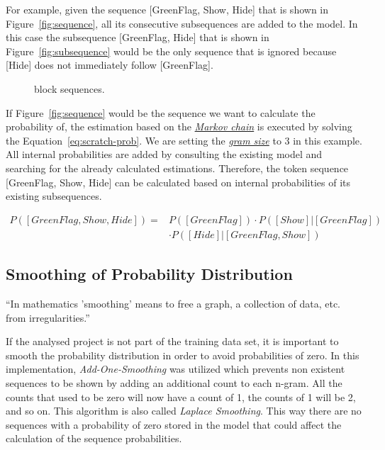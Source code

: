 For example, given the sequence [GreenFlag, Show, Hide] that is shown in Figure~\ref{fig:sequence}, all its consecutive subsequences are added to the model. In this case the subsequence [GreenFlag, Hide] that is shown in Figure~\ref{fig:subsequence} would be the only sequence that is ignored because [Hide] does not immediately follow [GreenFlag]. 

\begin{figure}[hbtp]%
    \centering
    \qquad
    \caption[\scratch{} block sequences]{\label{fig:sequences}\scratch{} block sequences.}%
\end{figure}

If Figure~\ref{fig:sequence} would be the sequence we want to calculate the probability of, the estimation based on the \hyperref[def:markov_chain]{\textit{Markov chain}} is executed by solving the Equation~\ref{eq:scratch-prob}. We are setting the \hyperref[def:gram size]{\textit{gram size}} to 3 in this example. All internal probabilities are added by consulting the existing model and searching for the already calculated estimations. Therefore, the token sequence [GreenFlag, Show, Hide] can be calculated based on internal probabilities of its existing subsequences.

\begin{equation} \label{eq:scratch-prob}
\begin{aligned}
P([GreenFlag, Show, Hide]) ={} & P([GreenFlag])\cdot P([Show]|[GreenFlag]) \\
							  & \cdot P([Hide]|[GreenFlag, Show])
\end{aligned}
\end{equation}


\subsection{Smoothing of Probability Distribution}\label{subsec:smoothing}

\begin{definition}[Smoothing]\label{def:smoothing}
	``In mathematics 'smoothing' means to free a graph, a collection of data, etc. from irregularities.''~\cite{smoothing}
\end{definition}

If the analysed project is not part of the training data set, it is important to smooth the probability distribution in order to avoid probabilities of zero. In this implementation, \textit{Add-One-Smoothing} was utilized which prevents non existent sequences to be shown by adding an additional count to each n-gram. All the counts that used to be zero will now have a count of 1, the counts of 1 will be 2, and so on. This algorithm is also called \textit{Laplace Smoothing}. This way there are no sequences with a probability of zero stored in the model that could affect the calculation of the sequence probabilities.

